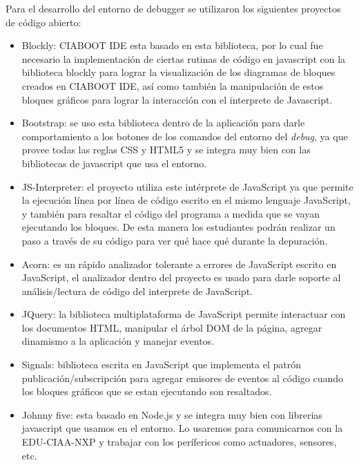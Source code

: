 Para el desarrollo del entorno de debugger se utilizaron los siguientes proyectos de código abierto:

\begin{itemize}
	\item Blockly\citep{blockly}: CIABOOT IDE esta basado en esta biblioteca, por lo cual fue necesario la implementación de ciertas rutinas de código en javascript con la biblioteca blockly para lograr la visualización de los diagramas de bloques creados en CIABOOT IDE, así como también la manipulación de estos bloques gráficos para lograr la interacción con el interprete de Javascript. 
	
	\item Bootstrap\citep{bootstrap}: se uso esta biblioteca dentro de la aplicación para darle comportamiento a los botones de los comandos del entorno del \emph{debug}, ya que provee todas las reglas CSS y HTML5 y se integra muy bien con las bibliotecas de javascript que usa el entorno.
	
	\item JS-Interpreter\citep{js-Interpreter}: el proyecto utiliza este intérprete de JavaScript ya que permite la ejecución línea por línea de código escrito en el mismo lenguaje JavaScript, y también para resaltar el código del programa a medida que se vayan ejecutando los bloques. De esta manera los estudiantes podrán realizar un paso a través de su código para ver qué hace qué durante la depuración. 

	\item Acorn\citep{acorn}: es un rápido analizador tolerante a errores de JavaScript escrito en JavaScript, el analizador dentro del proyecto es usado para darle soporte al análisis/lectura de código del interprete de JavaScript.
	
	\item JQuery\citep{jQuery}: la biblioteca multiplataforma de JavaScript permite interactuar con los documentos HTML, manipular el árbol DOM de la página, agregar dinamismo a la aplicación y manejar eventos.
	
	\item Signals\citep{signals}: biblioteca escrita en JavaScript que implementa el patrón publicación/subscripción para agregar emisores de eventos al código cuando los bloques gráficos que se estan ejecutando son resaltados.
	
	\item Johnny five\citep{johnny}: esta basado en Node.js y se integra muy bien con librerias javascript que usamos en el entorno. Lo usaremos para comunicarnos con la EDU-CIAA-NXP y trabajar con los perífericos como actuadores, sensores, etc.
	

\end{itemize}
